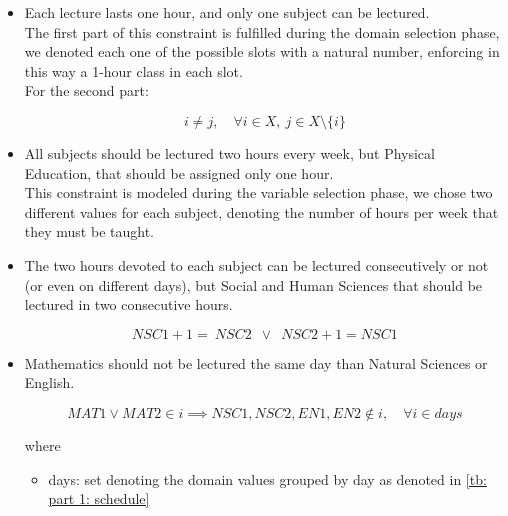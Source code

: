 \begin{itemize}
    \item Each lecture lasts one hour, and only one subject can be lectured.\\
    The first part of this constraint is fulfilled during the domain selection phase, we denoted each one of the possible slots with a natural number, enforcing in this way a 1-hour class in each slot.\\
    For the second part:
    
    \begin{equation}
    \label{eq: part 1 - all different slots}
        i \neq j, \quad \forall i \in X,\ j \in X \setminus \{ i \}
    \end{equation}
    
    \item All subjects should be lectured two hours every week, but Physical Education, that should be assigned only one hour.\\
    This constraint is modeled during the variable selection phase, we chose two different values for each subject, denoting the number of hours per week that they must be taught.
    
    \item The two hours devoted to each subject can be lectured consecutively or not (or even on different days), but Social and Human Sciences that should be lectured in two consecutive hours.
    
    \begin{equation}
        NSC1 + 1 = \ NSC2 \enspace \lor \enspace NSC2 + 1 = NSC1
    \end{equation}
    
    \item Mathematics should not be lectured the same day than Natural Sciences or English.
    
    \begin{equation}
    \label{eq: part 1 - no english/natural science classes with maths }
        MAT1 \lor  MAT2 \in i \implies NSC1, NSC2, EN1, EN2 \not \in i,\quad  \forall i \in days
    \end{equation}
    
    where 
    
   \begin{itemize}
       \item[] days: set denoting the domain values grouped by day as denoted in \ref{tb: part 1: schedule}
   \end{itemize}
    

\end{itemize}
